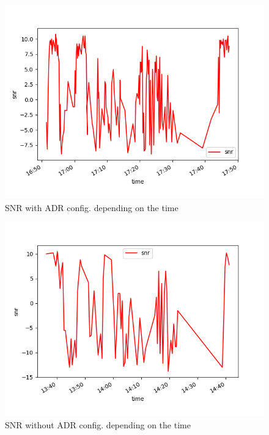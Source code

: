 \begin{figure}[htbp]
    \includegraphics[width=\linewidth]{Figure_3.png}
    \caption{SNR with ADR config. depending on the time}
    \label{chap:fifth:fig:3}
\end{figure}

\begin{figure}[htbp]
    \includegraphics[width=\linewidth]{Figure_3NoADR.png}
    \caption{SNR without ADR config. depending on the time}
    \label{chap:fifth:fig:3:noADR}
\end{figure}


